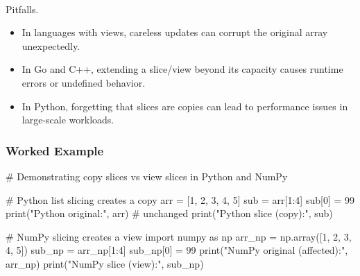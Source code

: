 \documentclass[
  letterpaper,
  DIV=11,
  numbers=noendperiod]{scrreprt}
\makeatletter
\let\oldparagraph\paragraph
\renewcommand{\paragraph}{
    \@ifstar
      \xxxParagraphStar
      \xxxParagraphNoStar
  }
\newcommand{\xxxParagraphStar}[1]{\oldparagraph*{#1}\mbox{}}
\newcommand{\xxxParagraphNoStar}[1]{\oldparagraph{#1}\mbox{}}
\newenvironment{Shaded}{\begin{snugshade}}{\end{snugshade}}
\newcommand{\BuiltInTok}[1]{\textcolor[rgb]{0.00,0.23,0.31}{#1}}
\newcommand{\CommentTok}[1]{\textcolor[rgb]{0.37,0.37,0.37}{#1}}
\newcommand{\DecValTok}[1]{\textcolor[rgb]{0.68,0.00,0.00}{#1}}
\newcommand{\ImportTok}[1]{\textcolor[rgb]{0.00,0.46,0.62}{#1}}
\newcommand{\NormalTok}[1]{\textcolor[rgb]{0.00,0.23,0.31}{#1}}
\newcommand{\OperatorTok}[1]{\textcolor[rgb]{0.37,0.37,0.37}{#1}}
\newcommand{\StringTok}[1]{\textcolor[rgb]{0.13,0.47,0.30}{#1}}
\providecommand{\tightlist}{%
  \setlength{\itemsep}{0pt}\setlength{\parskip}{0pt}}
\makeatother
\begin{document}
\paragraph{Pitfalls.}\label{pitfalls.-2}

\begin{itemize}
\tightlist
\item
  In languages with views, careless updates can corrupt the original
  array unexpectedly.
\item
  In Go and C++, extending a slice/view beyond its capacity causes
  runtime errors or undefined behavior.
\item
  In Python, forgetting that slices are copies can lead to performance
  issues in large-scale workloads.
\end{itemize}

\subsubsection{Worked Example}\label{worked-example-5}

\begin{Shaded}
\begin{Highlighting}[]
\CommentTok{\# Demonstrating copy slices vs view slices in Python and NumPy}

\CommentTok{\# Python list slicing creates a copy}
\NormalTok{arr }\OperatorTok{=}\NormalTok{ [}\DecValTok{1}\NormalTok{, }\DecValTok{2}\NormalTok{, }\DecValTok{3}\NormalTok{, }\DecValTok{4}\NormalTok{, }\DecValTok{5}\NormalTok{]}
\NormalTok{sub }\OperatorTok{=}\NormalTok{ arr[}\DecValTok{1}\NormalTok{:}\DecValTok{4}\NormalTok{]}
\NormalTok{sub[}\DecValTok{0}\NormalTok{] }\OperatorTok{=} \DecValTok{99}
\BuiltInTok{print}\NormalTok{(}\StringTok{"Python original:"}\NormalTok{, arr)  }\CommentTok{\# unchanged}
\BuiltInTok{print}\NormalTok{(}\StringTok{"Python slice (copy):"}\NormalTok{, sub)}

\CommentTok{\# NumPy slicing creates a view}
\ImportTok{import}\NormalTok{ numpy }\ImportTok{as}\NormalTok{ np}
\NormalTok{arr\_np }\OperatorTok{=}\NormalTok{ np.array([}\DecValTok{1}\NormalTok{, }\DecValTok{2}\NormalTok{, }\DecValTok{3}\NormalTok{, }\DecValTok{4}\NormalTok{, }\DecValTok{5}\NormalTok{])}
\NormalTok{sub\_np }\OperatorTok{=}\NormalTok{ arr\_np[}\DecValTok{1}\NormalTok{:}\DecValTok{4}\NormalTok{]}
\NormalTok{sub\_np[}\DecValTok{0}\NormalTok{] }\OperatorTok{=} \DecValTok{99}
\BuiltInTok{print}\NormalTok{(}\StringTok{"NumPy original (affected):"}\NormalTok{, arr\_np)}
\BuiltInTok{print}\NormalTok{(}\StringTok{"NumPy slice (view):"}\NormalTok{, sub\_np)}
\end{Highlighting}
\end{Shaded}
\end{document}
